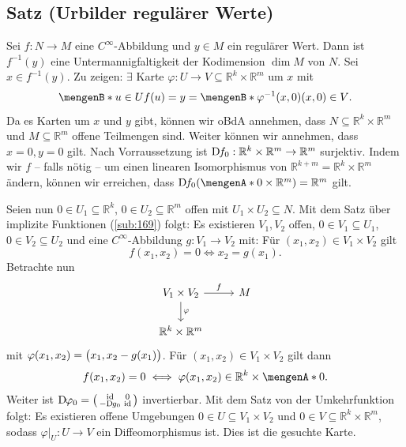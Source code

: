 \subsection{Satz (Urbilder regulärer Werte)} %
\label{sub:167}
Sei $f : N \to M$ eine $C^\infty$-Abbildung und $y \in M$ ein regulärer Wert. Dann ist $f ^{-1}(y)$ eine Untermannigfaltigkeit der Kodimension $\dim M$ von $N$.
Sei $x \in f ^{-1}(y)$. Zu zeigen: $\exists$ Karte $\varphi : U \to V \subseteq \mathds{R}^k \times \mathds{R}^m$ um $x$ mit 
\[
	\set[u \in U]{f(u)=y} = \set[\varphi ^{-1} (x,0)]{(x,0) \in V}.
\]
Da es Karten um $x$ und $y$ gibt, können wir oBdA annehmen, dass $N \subseteq \mathds{R}^k \times \mathds{R}^m$ und $M \subseteq \mathds{R}^m$ offene Teilmengen sind.
Weiter können wir annehmen, dass $x=0, y=0$ gilt. Nach Vorraussetzung ist $\D f_0 : \mathds{R}^k \times \mathds{R}^m \to \mathds{R}^m$ surjektiv. Indem wir $f$ -- falls 
nötig -- um einen linearen Isomorphismus von $\mathds{R}^{k+m} = \mathds{R}^k \times \mathds{R}^m$ ändern, können wir erreichen, dass 
$\D f_0 \enbrace*{\set{0} \times \mathds{R}^m } = \mathds{R}^m$ gilt.

Seien nun $0\in U_1 \subseteq \mathds{R}^k$, $0 \in U_2 \subseteq \mathds{R}^m$ offen mit $U_1 \times U_2 \subseteq N$. Mit dem Satz über implizite Funktionen (\ref{sub:169})
folgt: Es existieren $V_1, V_2$ offen, $0 \in V_1 \subseteq U_1$, $0 \in V_2 \subseteq U_2$ und eine $C^\infty$-Abbildung $g : V_1 \to V_2$  mit: Für 
$(x_1, x_2) \in V_1 \times V_2$ gilt
\[
	f(x_1, x_2) = 0 \iff x_2 = g(x_1).
\]
Betrachte nun
\[
	\begin{tikzcd}
		V_1 \times V_2 \rar["f"]  \dar["\varphi"]& M \\
		\mathds{R}^k \times \mathds{R}^m
	\end{tikzcd}
\]
mit $\varphi(x_1, x_2) = \enbrace[\big]{x_1, x_2 - g(x_1)}$. Für $(x_1, x_2) \in V_1 \times V_2$ gilt dann
\[
	f(x_1, x_2) = 0 \iff \varphi(x_1, x_2) \in \mathds{R}^k \times \set{0}.
\]
Weiter ist $\D \varphi_0 = \begin{psmallmatrix}
	\id & 0 \\
	-\D g_0 & \id
\end{psmallmatrix}$ invertierbar. Mit dem Satz von der Umkehrfunktion folgt: Es existieren offene Umgebungen $ 0 \in U \subseteq V_1 \times V_2$ und 
$0 \in V \subseteq \mathds{R}^k \times \mathds{R}^m$, sodass $\varphi \big|_{U} : U \to V$ ein Diffeomorphismus ist. Dies ist die gesuchte Karte. \bewende

